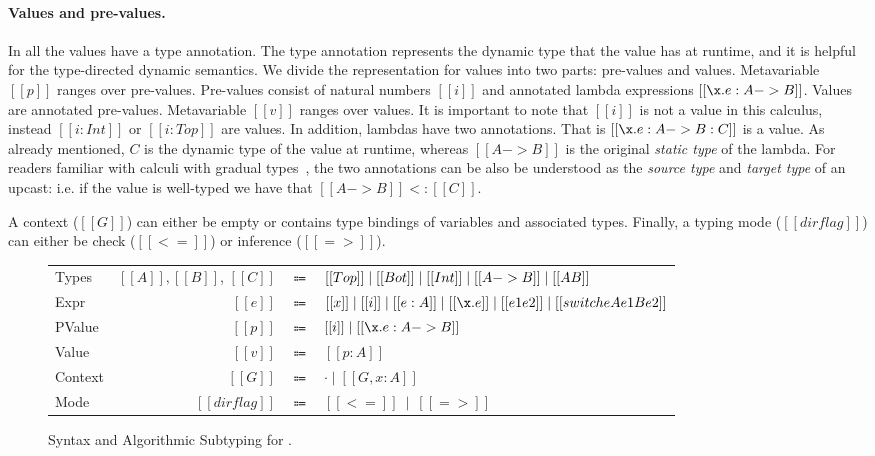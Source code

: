 \paragraph{Values and pre-values.} In \name all the values have
a type annotation. The type annotation represents the dynamic type
that the value has at runtime, and
it is helpful for the type-directed dynamic semantics.
We divide the representation for values into two parts: pre-values and
values.
Metavariable $[[p]]$ ranges over pre-values. Pre-values
consist of natural numbers $[[i]]$
and annotated lambda expressions $[[\x.e : A -> B]]$. Values are
annotated pre-values. Metavariable $[[v]]$ ranges over
values. It is important to note that $[[i]]$ is not a value in this
calculus, instead $[[i:Int]]$ or $[[i:Top]]$ are values.
In addition, lambdas have two annotations. That is $[[\x.e : A -> B : C]]$ is a value.
As already mentioned, $C$ is the dynamic type of the value
at runtime, whereas $[[A -> B]]$ is the original \emph{static type} of the lambda.
For readers familiar with calculi with gradual types~\cite{}, the two annotations
can be also be understood as the \emph{source type} and \emph{target type}
of an upcast: i.e. if the value is well-typed we have that $[[A -> B]] <: [[C]]$.

A context ($[[G]]$) can
either be empty or contains type bindings of variables and associated
types. Finally, a typing mode ($[[dirflag]]$) can either be check ($[[<=]]$)
or inference ($[[=>]]$).

\begin{figure}[t]
  \begin{small}
    \centering
    \begin{tabular}{lrcl} \toprule
      Types & $[[A]], [[B]]$, $[[C]]$ & $\Coloneqq$ & $ [[Top]] \mid [[Bot]] \mid [[Int]] \mid [[A -> B]] \mid [[A \/ B]] $ \\
      Expr & $[[e]]$ & $\Coloneqq$ & $[[x]] \mid [[i]] \mid [[e:A]] \mid [[\x.e]] \mid [[e1 e2]] \mid [[switch e A e1 B e2]]$\\
      PValue & $[[p]]$ & $\Coloneqq$ & $[[i]] \mid [[\x.e : A -> B]] $\\
      Value & $[[v]]$ & $\Coloneqq$ & $[[p:A]]$\\
      Context & $[[G]]$ & $\Coloneqq$ & $ \cdot \mid [[G , x : A]]$ \\
      Mode & $[[dirflag]]$ & $\Coloneqq$ & $[[<=]] \ \mid \ [[=>]]$ \\
      \bottomrule
    \end{tabular}
  \end{small}
  \begin{small}
    \centering
  \end{small}

  \caption{Syntax and Algorithmic Subtyping for \cal.   }
  \label{fig:union:syntax}
\end{figure}
 

